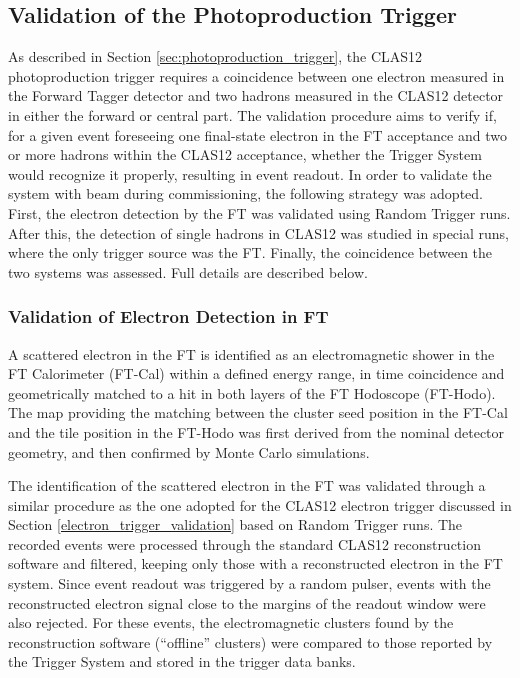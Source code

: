 \subsection{Validation of the Photoproduction Trigger}

As described in Section \ref{sec:photoproduction_trigger}, the CLAS12 photoproduction trigger requires a coincidence between one electron measured in the Forward Tagger detector and two hadrons measured in the CLAS12 detector in either the forward or central part. The validation procedure aims to verify if, for a given event foreseeing one final-state electron in the FT acceptance and two or more hadrons within the CLAS12 acceptance, whether the Trigger System would recognize it properly, resulting in event readout. In order to validate the system with beam during commissioning, the following strategy was adopted. First, the electron detection by the FT was validated using Random Trigger runs. After this, the detection of single hadrons in CLAS12 was studied in special runs, where the only trigger source was the FT. Finally, the coincidence between the two systems was assessed. Full details are described below.

\subsubsection{Validation of Electron Detection in FT}

A scattered electron in the FT is identified as an electromagnetic shower in the FT Calorimeter (FT-Cal) within a defined energy range, in time coincidence and geometrically matched to a hit in both layers of the FT Hodoscope (FT-Hodo). The map providing the matching between the cluster seed position in the FT-Cal and the tile position in the FT-Hodo was first derived from the nominal detector geometry, and then confirmed by Monte Carlo simulations.

The identification of the scattered electron in the FT was validated through a similar procedure as the one adopted for the CLAS12 electron trigger discussed in Section \ref{electron_trigger_validation} based on Random Trigger runs. The recorded events were processed through the standard CLAS12 reconstruction software and filtered, keeping only those with a reconstructed electron in the FT system. Since event readout was triggered by a random pulser, events with the reconstructed electron signal close to the margins of the readout window were also rejected. For these events, the electromagnetic clusters found by the reconstruction software (``offline'' clusters) were compared to those reported by the Trigger System and stored in the trigger data banks.

